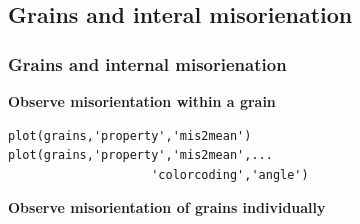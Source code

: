 \subsection{Grains and interal misorienation}
\begin{frame}[fragile]
  \frametitle{Grains and internal misorienation}



\begin{overprint}
\textbf{Observe misorientation within a grain} %
\begin{lstlisting}
plot(grains,'property','mis2mean')
plot(grains,'property','mis2mean',...
                    'colorcoding','angle')
\end{lstlisting}
\begin{center}
%
\par\end{center}


\begin{overlayarea}{\linewidth}{10cm}
\textbf{Observe misorientation of grains individually} %


\end{overlayarea}
\end{overprint}
\end{frame}
